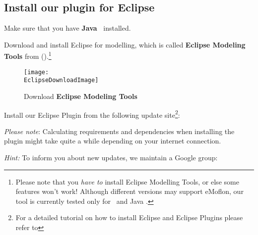 \genHeader
\hypertarget{installPlugin common}{} 
\subsection{Install our plugin for Eclipse}
 
\vspace{0.5cm}
 
\begin{stepbystep}

\item  Make sure that you have \textbf{Java~\JavaVersion{}} installed.
 
\item  Download and install Eclipse \EclipseVersion for modelling, which is called \textbf{Eclipse Modeling Tools} from \EclipseDownloadLink ().\footnote{Please
note that you \emph{have to} install Eclipse Modelling Tools, or else some features won't work! Although different versions may support eMoflon, our tool is
currently tested only for \EclipseVersion~and Java \JavaVersion.} 

\begin{figure}[htbp]
	\centering
  	\texttt{[image: \\EclipseDownloadImage]}
	\caption{Download \textbf{Eclipse Modeling Tools}}
	\label{eclipseDownload}
\end{figure}

\vspace{0.9cm}

\item  Install our Eclipse Plugin from the following update site\footnote{For a detailed tutorial on how to install Eclipse and Eclipse
Plugins please refer to }:\\ \eMoflonUpdateSite

\emph{Please note}: Calculating requirements and dependencies when
installing the plugin might take quite a while depending on your internet connection.

\emph{Hint:} To inform you about new updates, we maintain a Google group: 
\end{stepbystep}
